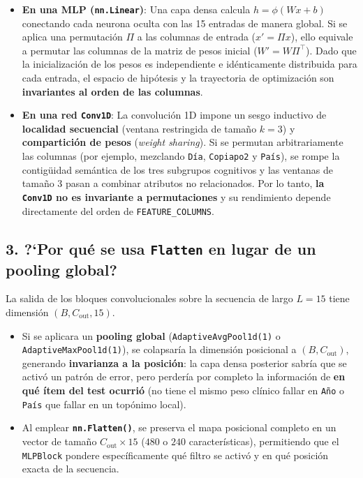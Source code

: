 \documentclass[11pt,a4paper]{article}
\begin{document}
\begin{itemize}
    \item \textbf{En una MLP (\texttt{nn.Linear})}: Una capa densa calcula $h = \phi(Wx + b)$ conectando cada neurona oculta con las 15 entradas de manera global. Si se aplica una permutaci\'on $\Pi$ a las columnas de entrada ($x' = \Pi x$), ello equivale a permutar las columnas de la matriz de pesos inicial ($W' = W\Pi^\top$). Dado que la inicializaci\'on de los pesos es independiente e id\'enticamente distribuida para cada entrada, el espacio de hip\'otesis y la trayectoria de optimizaci\'on son \textbf{invariantes al orden de las columnas}.
    \item \textbf{En una red \texttt{Conv1D}}: La convoluci\'on 1D impone un sesgo inductivo de \textbf{localidad secuencial} (ventana restringida de tama\~no $k=3$) y \textbf{compartici\'on de pesos} (\textit{weight sharing}). Si se permutan arbitrariamente las columnas (por ejemplo, mezclando \texttt{D\'ia}, \texttt{Copiapo2} y \texttt{Pa\'is}), se rompe la contig\"uidad sem\'antica de los tres subgrupos cognitivos y las ventanas de tama\~no 3 pasan a combinar atributos no relacionados. Por lo tanto, \textbf{la \texttt{Conv1D} no es invariante a permutaciones} y su rendimiento depende directamente del orden de \texttt{FEATURE\_COLUMNS}.
\end{itemize}

\subsection{3. ?`Por qu\'e se usa \texttt{Flatten} en lugar de un pooling global?}

La salida de los bloques convolucionales sobre la secuencia de largo $L = 15$ tiene dimensi\'on $(B, C_{\text{out}}, 15)$.
\begin{itemize}
    \item Si se aplicara un \textbf{pooling global} (\texttt{AdaptiveAvgPool1d(1)} o \texttt{AdaptiveMaxPool1d(1)}), se colapsar\'ia la dimensi\'on posicional a $(B, C_{\text{out}})$, generando \textbf{invarianza a la posici\'on}: la capa densa posterior sabr\'ia que se activ\'o un patr\'on de error, pero perder\'ia por completo la informaci\'on de \textbf{en qu\'e \'item del test ocurri\'o} (no tiene el mismo peso cl\'inico fallar en \texttt{A\~no} o \texttt{Pa\'is} que fallar en un top\'onimo local).
    \item Al emplear \textbf{\texttt{nn.Flatten()}}, se preserva el mapa posicional completo en un vector de tama\~no $C_{\text{out}} \times 15$ ($480$ o $240$ caracter\'isticas), permitiendo que el \texttt{MLPBlock} pondere espec\'ificamente qu\'e filtro se activ\'o y en qu\'e posici\'on exacta de la secuencia.
\end{itemize}
\end{document}
